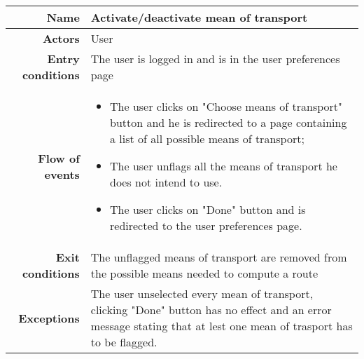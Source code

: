 \begin{center}
\begin{tabular}{r|p{7cm}}
\bf\large Name&\bf\large Activate/deactivate mean of transport\\
\hline
\hline
\bf Actors&User\\
\hline
\bf Entry conditions&The user is logged in and is in the user preferences page\\
\hline
\bf Flow of events&
\begin{itemize}
\item The user clicks on "Choose means of transport" button and he is redirected to a page containing a list of all possible means of transport;
\item  The user unflags all the means of transport he does not intend to use.
\item  The user clicks on "Done" button and is redirected to the user preferences page.
\end{itemize}
\\
\hline
\bf Exit conditions&The unflagged means of transport are removed from the possible means needed to compute a route\\
\hline
\bf Exceptions&The user unselected every mean of transport, clicking "Done" button has no effect and an error message stating that at lest one mean of trasport has to be flagged.
\\
\hline

\end{tabular}
\end{center}